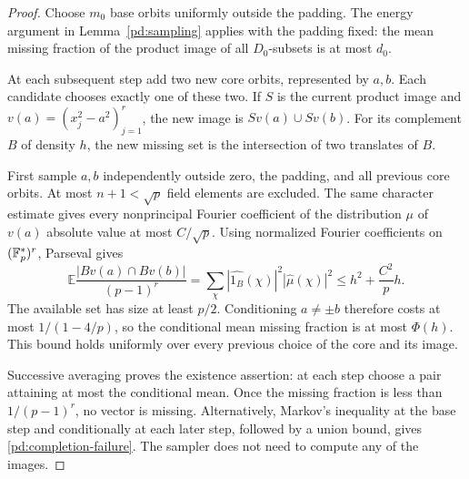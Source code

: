 \begin{proof}
Choose $m_0$ base orbits uniformly outside the padding. The energy
argument in Lemma~\ref{pd:sampling} applies with the padding fixed:
the mean missing fraction of the product image of all $D_0$-subsets
is at most $d_0$.

At each subsequent step add two new core orbits, represented by $a,b$.
Each candidate chooses exactly one of these two. If $S$ is the current
product image and $v(a)=(x_j^2-a^2)_{j=1}^r$, the new image is
$Sv(a)\cup Sv(b)$. For its complement $B$ of density $h$, the new
missing set is the intersection of two translates of $B$.

First sample $a,b$ independently outside zero, the padding, and all
previous core orbits. At most $n+1<\sqrt p$ field elements are excluded.
The same character estimate gives every nonprincipal Fourier coefficient
of the distribution $\mu$ of $v(a)$ absolute value at most $C/\sqrt p$.
Using normalized Fourier coefficients on $(\mathbb F_p^*)^r$, Parseval gives
\[
 \mathbb E\frac{|Bv(a)\cap Bv(b)|}{(p-1)^r}
 =\sum_\chi |\widehat{1_B}(\chi)|^2|\widehat\mu(\chi)|^2
 \le h^2+\frac{C^2}{p}h.
\]
The available set has size at least $p/2$. Conditioning $a\ne\pm b$
therefore costs at most $1/(1-4/p)$, so the conditional mean missing
fraction is at most $\Phi(h)$. This bound holds uniformly over every
previous choice of the core and its image.

Successive averaging proves the existence assertion: at each step
choose a pair attaining at most the conditional mean. Once the missing
fraction is less than $1/(p-1)^r$, no vector is missing. Alternatively,
Markov's inequality at the base step and conditionally at each later
step, followed by a union bound, gives \eqref{pd:completion-failure}.
The sampler does not need to compute any of the images.
\end{proof}

